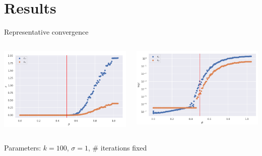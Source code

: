 \documentclass{beamer}
\begin{document}
\section{Results}
\begin{frame}{Representative convergence}
	\begin{minipage}[0.95\textheight]{\textwidth}
	\begin{columns}[T]
	\begin{column}{0.50\textwidth}
	\includegraphics[width=\textwidth, keepaspectratio]{images/N100_sigma1.png}
	\end{column}
	\begin{column}{0.50\textwidth}
	\includegraphics[width=\textwidth, keepaspectratio]{images/N100_sigma1log.png}
	\end{column}
	\end{columns}
	\end{minipage}
	\begin{center}
		Parameters: $k=100$, $\sigma=1$, \# iterations fixed
	\end{center}
\end{frame}
\end{document}
